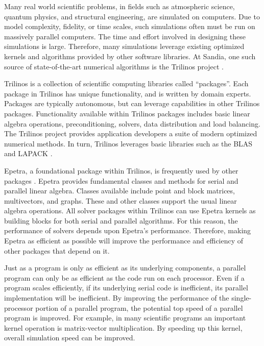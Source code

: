 Many real world scientific problems, in fields such as atmospheric science, 
quantum physics, and
structural engineering, are simulated on computers.  Due to model complexity, fidelity, or 
time scales, such simulations often must be run on massively parallel computers.
The time and effort involved in designing these simulations is large.
Therefore, many simulations leverage existing optimized kernels and algorithms provided by other software libraries.
At Sandia, one such source of state-of-the-art numerical algorithms is the Trilinos project \cite{IK:Trilinos}.

Trilinos is a collection of scientific computing libraries called ``packages''.  Each package in Trilinos has
unique functionality, and is written by domain experts. Packages are typically autonomous, but can leverage capabilities
in other Trilinos packages.  Functionality available
within Trilinos packages includes basic linear algebra operations, preconditioning, solvers, data distribution and 
load balancing.  The Trilinos project provides application developers a suite of modern optimized numerical methods.
In turn, Trilinos leverages basic libraries such as the BLAS \cite{IK:BLAS} and LAPACK \cite{IK:LaPACK}. 

Epetra, a foundational package within Trilinos, is frequently used by other packages \cite{IK:Epetra-site}.  
Epetra provides fundamental classes and methods for serial and parallel linear algebra.  Classes available include
point and block matrices, multivectors, and graphs.  These and other classes support the usual linear algebra
operations.  All solver packages within Trilinos can use
Epetra kernels as building blocks for both serial and parallel algorithms.  For this reason, the performance of
solvers depends upon Epetra's performance.  Therefore, making Epetra as efficient as
possible will improve the performance and efficiency of other packages that depend on it.

Just as a program is only as efficient as its underlying components, a parallel program can only
be as efficient as the code run on each processor.  Even if a program scales efficiently, if its underlying
serial code is inefficient, its parallel implementation will be inefficient.  By improving the performance of the single-processor
portion of a parallel program, the potential top speed of a parallel program is improved.  For example, in many scientific programs an
important kernel operation is matrix-vector multiplication.  By speeding up this kernel,
overall simulation speed can be improved.

